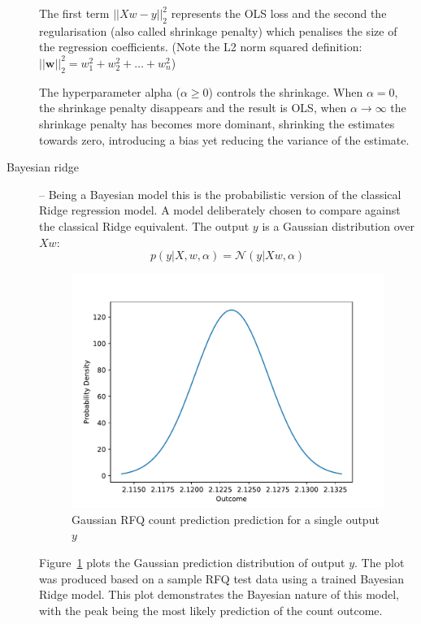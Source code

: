 \begin{description}
    The first term ${|| Xw-y ||}_{2}^{2}$ represents the OLS loss and the second the regularisation (also called shrinkage penalty) which penalises the size of the regression coefficients. (Note the L2 norm squared definition: ${|| \mathbf{w} ||}_{2}^{2} = w_1^2 + w_2^2 + \dots + w_n^2$)

    The hyperparameter alpha ($\alpha\geq 0$) controls the shrinkage. When $\alpha=0$, the shrinkage penalty disappears and the result is OLS, when $\alpha\rightarrow\infty$ the shrinkage penalty has becomes more dominant, shrinking the estimates towards zero, introducing a bias yet reducing the variance of the estimate.

    \item[Bayesian ridge] -- Being a Bayesian model this is the probabilistic version of the classical Ridge regression model. A model deliberately chosen to compare against the classical Ridge equivalent. The output $y$ is a Gaussian distribution over $Xw$:
    \begin{equation}
        p(y|X,w,\alpha) = \mathcal{N} (y|Xw,\alpha)
    \end{equation}


\begin{figure}[!ht]\centering
    \includegraphics[width=0.8\linewidth]{./figures/Ch4_RidgeProbs}
    \caption{Gaussian RFQ count prediction prediction for a single output $y$}\label{Ch4Fig:RidgeProbs}
\end{figure}

Figure~\ref{Ch4Fig:RidgeProbs} plots the Gaussian prediction distribution of output $y$. The plot was produced based on a sample RFQ test data using a trained Bayesian Ridge model. This plot demonstrates the Bayesian nature of this model, with the peak being the most likely prediction of the count outcome.


\end{description}
